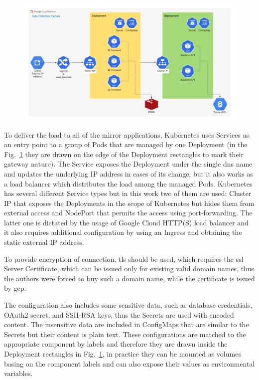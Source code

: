 \begin{figure}
    \includegraphics[width=\linewidth]{resources/gcp_diagram}
    \label{fig:gcp_diagram}
\end{figure}

To deliver the load to all of the mirror applications, Kubernetes uses Services as an entry point to a group of Pods that are managed by one Deployment (in the Fig.~\ref{fig:gcp_diagram} they are drawn on the edge of the Deployment rectangles to mark their gateway nature).
The Service exposes the Deployment under the single \gls{dns} name and updates the underlying IP address in cases of its change, but it also works as a load balancer which distributes the load among the managed Pods.
Kubernetes has several different Service types but in this work two of them are used: Cluster IP that exposes the Deployments in the scope of Kubernetes but hides them from external access and NodePort that permits the access using port-forwarding.
The latter one is dictated by the usage of Google Cloud HTTP(S) load balancer and it also requires additional configuration by using an Ingress and obtaining the static external IP address.

To provide encryption of connection, \gls{tls} should be used, which requires the \gls{ssl} Server Certificate, which can be issued only for existing valid domain names, thus the authors were forced to buy such a domain name, while the certificate is issued by \gls{gcp}.

The configuration also includes some sensitive data, such as database credentials, OAuth2 secret, and SSH-RSA keys, thus the Secrets are used with encoded content.
The insensitive data are included in ConfigMaps that are similar to the Secrets but their content is plain text.
These configurations are matched to the appropriate component by labels and therefore they are drawn inside the Deployment rectangles in Fig.~\ref{fig:gcp_diagram}, in practice they can be mounted as volumes basing on the component labels and can also expose their values as environmental variables.

